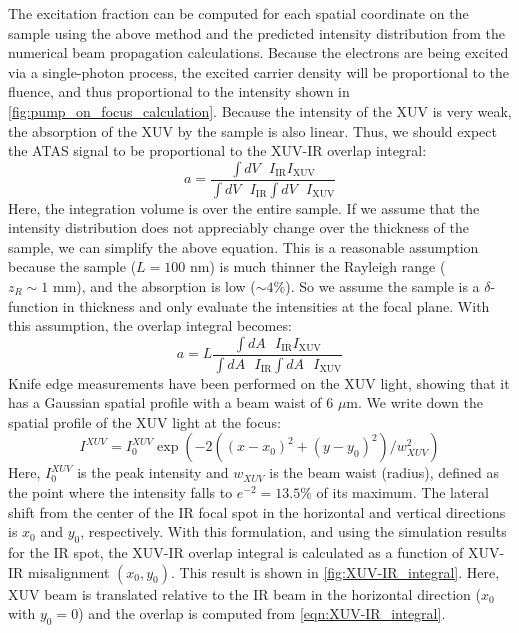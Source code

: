 The excitation fraction can be computed for each spatial coordinate on the sample using the above method and the predicted intensity distribution from the numerical beam propagation calculations. Because the electrons are being excited via a single-photon process, the excited carrier density will be proportional to the fluence, and thus proportional to the intensity shown in \cref{fig:pump_on_focus_calculation}. Because the intensity of the XUV is very weak, the absorption of the XUV by the sample is also linear. Thus, we should expect the ATAS signal to be proportional to the XUV-IR overlap integral:
\begin{equation}
a = \frac{ \int dV \text{ } I_{\text{IR}} I_{\text{XUV}} }{ \int dV \text{ } I_{\text{IR}} \int dV \text{ } I_{\text{XUV}} }
\label{eqn:XUV-IR_integral_volume}
\end{equation}
Here, the integration volume is over the entire sample. If we assume that the intensity distribution does not appreciably change over the thickness of the sample, we can simplify the above equation. This is a reasonable assumption because the sample ($L = 100 \text{ nm}$) is much thinner the Rayleigh range ($z_R \sim 1 \text{ mm}$), and the absorption is low ($\sim 4\%$). So we assume the sample is a $\delta$-function in thickness and only evaluate the intensities at the focal plane. With this assumption, the overlap integral becomes:
\begin{equation}
a = L \frac{ \int dA \text{ } I_{\text{IR}} I_{\text{XUV}} }{ \int dA \text{ } I_{\text{IR}} \int dA \text{ } I_{\text{XUV}} }
\label{eqn:XUV-IR_integral}
\end{equation}
Knife edge measurements have been performed on the XUV light, showing that it has a Gaussian spatial profile with a beam waist of 6 $\mu$m. We write down the spatial profile of the XUV light at the focus:
\begin{equation}
I^{XUV} = I_0^{XUV} \exp \left( - 2 ((x-x_0)^2 + (y-y_0)^2) /  w_{XUV}^2 \right)
\end{equation}
Here, $I_0^{XUV}$ is the peak intensity and $w_{XUV}$ is the beam waist (radius), defined as the point where the intensity falls to $e^{-2} = 13.5\%$ of its maximum. The lateral shift from the center of the IR focal spot in the horizontal and vertical directions is $x_0$ and $y_0$, respectively. With this formulation, and using the simulation results for the IR spot, the XUV-IR overlap integral is calculated as a function of XUV-IR misalignment $(x_0, y_0)$. This result is shown in \cref{fig:XUV-IR_integral}. Here, XUV beam is translated relative to the IR beam in the horizontal direction ($x_0$ with $y_0=0$) and the overlap is computed from \cref{eqn:XUV-IR_integral}.

